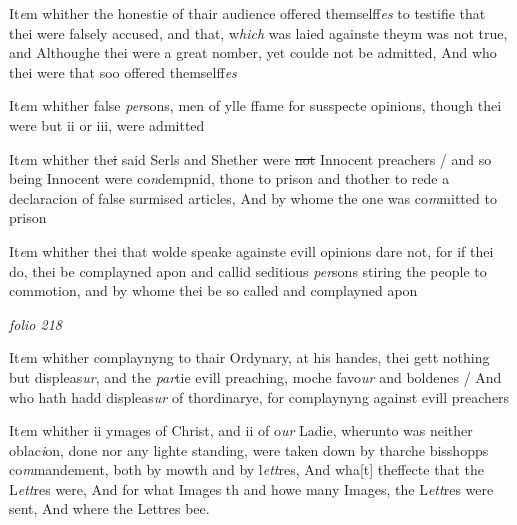 \documentclass[12pt, a4paper]{book}
\begin{document}
		\ifthenelse{\isodd{\thepage}}
		{\reversemarginpar}
		{\normalmarginpar}
		It\textit{e}m whither the honestie of thair audience offered themselff\textit{es}
to testifie that thei were falsely accused, and that, w\textit{hich} 
was laied againste theym was not true, and Althoughe thei
were a great nomber, yet coulde not be admitted, And
who thei were that soo offered themselff\textit{es}
            		
		\ifthenelse{\isodd{\thepage}}
		{\reversemarginpar}
		{\normalmarginpar}
		It\textit{e}m whither false \textit{per}sons, men of ylle ffame for susspecte
            			opinions, though thei were but ii or iii, were admitted
            		
		\ifthenelse{\isodd{\thepage}}
		{\reversemarginpar}
		{\normalmarginpar}
		It\textit{e}m whither the\sout{i}
            			said Serls and Shether
			 were \sout{not} Innocent preachers / and so being
Innocent were co\textit{n}dempnid, thone to prison and thother to rede
a declaracion of false surmised articles, And by whome the
one was co\textit{m}mitted to prison
            		
		\ifthenelse{\isodd{\thepage}}
		{\reversemarginpar}
		{\normalmarginpar}
		It\textit{e}m whither thei that wolde speake againste evill opinions
dare not, for if thei do, thei be complayned apon and callid
seditious \textit{per}sons stiring the people to commotion, and by whome
thei be so called and complayned apon

\dotfill
						\newpage
{}

\textit{folio 218}



		\ifthenelse{\isodd{\thepage}}
		{\reversemarginpar}
		{\normalmarginpar}
		It\textit{e}m whither complaynyng to thair Ordynary, at his 
handes, thei gett nothing but displeas\textit{ur}, and the \textit{par}tie
evill preaching, moche favo\textit{ur} and boldenes / And who
hath hadd displeas\textit{ur} of thordinarye, for complaynyng
against evill preachers

		\ifthenelse{\isodd{\thepage}}
		{\reversemarginpar}
		{\normalmarginpar}
		It\textit{e}m whither ii ymages of Christ, and ii of o\textit{ur} Ladie,
wherunto was neither oblac\textit{i}on, done nor any lighte
standing, were taken down by tharche bisshopps
co\textit{m}mandement, both by mowth and by l\textit{ett}res, And wha[t]
theffecte that the L\textit{ett}res were, And for what Images
th and howe many Images, the L\textit{ett}res were sent, And 
where the Lettres bee.
\end{document}
